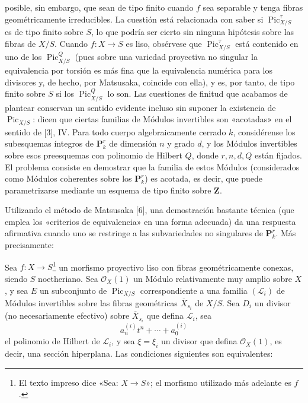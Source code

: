 posible, sin embargo, que sean de tipo finito cuando $f$ sea separable y tenga
fibras geométricamente irreducibles. La cuestión está relacionada con saber si
$\operatorname{Pic}_{X/S}^\tau$ es de tipo finito sobre $S$, lo que podría ser
cierto sin ninguna hipótesis sobre las fibras de $X/S$. Cuando
$f:X\longrightarrow S$ es liso, obsérvese que
$\operatorname{Pic}_{X/S}^\tau$ está contenido en uno de los
$\operatorname{Pic}_{X/S}^Q$ (pues sobre una variedad proyectiva no singular la
equivalencia por torsión es más fina que la equivalencia numérica para los
divisores y, de hecho, por Matsusaka, coincide con ella), y es, por tanto, de
tipo finito sobre $S$ si los $\operatorname{Pic}_{X/S}^Q$ lo son. Las
cuestiones de finitud que acabamos de plantear conservan un sentido evidente
incluso sin suponer la existencia de $\operatorname{Pic}_{X/S}$: dicen que
ciertas familias de Módulos invertibles son «acotadas» en el sentido de [3], IV.
Para todo cuerpo algebraicamente cerrado $k$, considérense los subesquemas
íntegros de $\mathbf P_k^r$ de dimensión $n$ y grado $d$, y los Módulos
invertibles sobre esos preesquemas con polinomio de Hilbert $Q$, donde
$r,n,d,Q$ están fijados. El problema consiste en demostrar que la familia de
estos Módulos (considerados como Módulos coherentes sobre los $\mathbf P_k^r$) es
acotada, es decir, que puede parametrizarse mediante un esquema de tipo finito
sobre $\mathbf Z$.

Utilizando el método de Matsusaka [6], una demostración bastante técnica (que
emplea los «criterios de equivalencia» en una forma adecuada) da una respuesta
afirmativa cuando uno se restringe a las subvariedades no singulares de
$\mathbf P_k^r$. Más precisamente:

 Sea $f:X\longrightarrow S$\footnote{El texto impreso
dice «Sea: $X\longrightarrow S$»; el morfismo utilizado más adelante es $f$.}
un morfismo proyectivo liso con fibras geométricamente conexas, siendo $S$
noetheriano. Sea $\mathcal O_X(1)$ un Módulo relativamente muy amplio sobre $X$,
y sea $E$ un subconjunto de $\operatorname{Pic}_{X/S}$ correspondiente a una
familia $(\mathcal L_i)$ de Módulos invertibles sobre las fibras geométricas
$\overline X_{s_i}$ de $X/S$. Sea $D_i$ un divisor (no necesariamente
efectivo) sobre $\overline X_{s_i}$ que defina $\mathcal L_i$, sea
\[
a_n^{(i)}t^n+\cdots+a_0^{(i)}
\]
el polinomio de Hilbert de $\mathcal L_i$, y sea $\xi=\xi_i$ un divisor que
defina $\mathcal O_X(1)$, es decir, una sección hiperplana. Las condiciones
siguientes son equivalentes:

